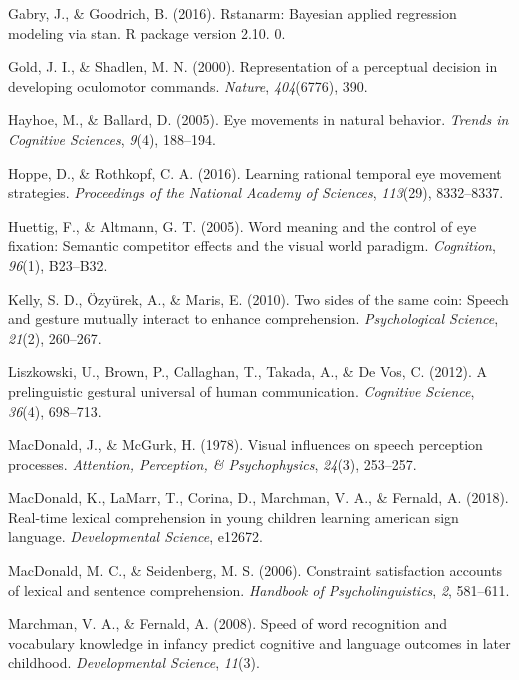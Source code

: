 \documentclass[english,floatsintext,man]{apa6}
\begin{document}
\leavevmode\hypertarget{ref-gabry2016rstanarm}{}%
Gabry, J., \& Goodrich, B. (2016). Rstanarm: Bayesian applied regression
modeling via stan. R package version 2.10. 0.

\leavevmode\hypertarget{ref-gold2000representation}{}%
Gold, J. I., \& Shadlen, M. N. (2000). Representation of a perceptual
decision in developing oculomotor commands. \emph{Nature},
\emph{404}(6776), 390.

\leavevmode\hypertarget{ref-hayhoe2005eye}{}%
Hayhoe, M., \& Ballard, D. (2005). Eye movements in natural behavior.
\emph{Trends in Cognitive Sciences}, \emph{9}(4), 188--194.

\leavevmode\hypertarget{ref-hoppe2016learning}{}%
Hoppe, D., \& Rothkopf, C. A. (2016). Learning rational temporal eye
movement strategies. \emph{Proceedings of the National Academy of
Sciences}, \emph{113}(29), 8332--8337.

\leavevmode\hypertarget{ref-huettig2005word}{}%
Huettig, F., \& Altmann, G. T. (2005). Word meaning and the control of
eye fixation: Semantic competitor effects and the visual world paradigm.
\emph{Cognition}, \emph{96}(1), B23--B32.

\leavevmode\hypertarget{ref-kelly2010two}{}%
Kelly, S. D., Özyürek, A., \& Maris, E. (2010). Two sides of the same
coin: Speech and gesture mutually interact to enhance comprehension.
\emph{Psychological Science}, \emph{21}(2), 260--267.

\leavevmode\hypertarget{ref-liszkowski2012prelinguistic}{}%
Liszkowski, U., Brown, P., Callaghan, T., Takada, A., \& De Vos, C.
(2012). A prelinguistic gestural universal of human communication.
\emph{Cognitive Science}, \emph{36}(4), 698--713.

\leavevmode\hypertarget{ref-macdonald1978visual}{}%
MacDonald, J., \& McGurk, H. (1978). Visual influences on speech
perception processes. \emph{Attention, Perception, \& Psychophysics},
\emph{24}(3), 253--257.

\leavevmode\hypertarget{ref-macdonald2018real}{}%
MacDonald, K., LaMarr, T., Corina, D., Marchman, V. A., \& Fernald, A.
(2018). Real-time lexical comprehension in young children learning
american sign language. \emph{Developmental Science}, e12672.

\leavevmode\hypertarget{ref-macdonald2006constraint}{}%
MacDonald, M. C., \& Seidenberg, M. S. (2006). Constraint satisfaction
accounts of lexical and sentence comprehension. \emph{Handbook of
Psycholinguistics}, \emph{2}, 581--611.

\leavevmode\hypertarget{ref-marchman2008speed}{}%
Marchman, V. A., \& Fernald, A. (2008). Speed of word recognition and
vocabulary knowledge in infancy predict cognitive and language outcomes
in later childhood. \emph{Developmental Science}, \emph{11}(3).
\end{document}
